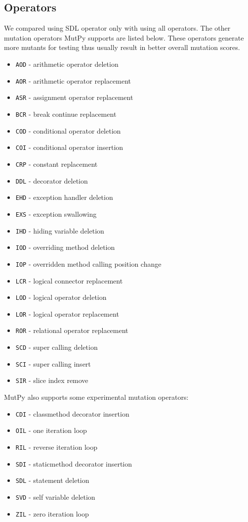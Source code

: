 \documentclass[12pt]{article}
\begin{document}
\subsection{Operators}
We compared using SDL operator only with using all operators. The other mutation operators MutPy supports are listed below. These operators generate more mutants for testing thus usually result in better overall mutation scores.

\begin{itemize}
  \itemsep0em 
  \item \texttt{AOD} - arithmetic operator deletion
  \item \texttt{AOR} - arithmetic operator replacement
  \item \texttt{ASR} - assignment operator replacement
  \item \texttt{BCR} - break continue replacement
  \item \texttt{COD} - conditional operator deletion
  \item \texttt{COI} - conditional operator insertion
  \item \texttt{CRP} - constant replacement
  \item \texttt{DDL} - decorator deletion
  \item \texttt{EHD} - exception handler deletion
  \item \texttt{EXS} - exception swallowing
  \item \texttt{IHD} - hiding variable deletion
  \item \texttt{IOD} - overriding method deletion
  \item \texttt{IOP} - overridden method calling position change
  \item \texttt{LCR} - logical connector replacement
  \item \texttt{LOD} - logical operator deletion
  \item \texttt{LOR} - logical operator replacement
  \item \texttt{ROR} - relational operator replacement
  \item \texttt{SCD} - super calling deletion
  \item \texttt{SCI} - super calling insert
  \item \texttt{SIR} - slice index remove
\end{itemize}

MutPy also supports some experimental mutation operators:

\begin{itemize}
  \itemsep0em 
  \item \texttt{CDI} - classmethod decorator insertion
  \item \texttt{OIL} - one iteration loop
  \item \texttt{RIL} - reverse iteration loop
  \item \texttt{SDI} - staticmethod decorator insertion
  \item \texttt{SDL} - statement deletion
  \item \texttt{SVD} - self variable deletion
  \item \texttt{ZIL} - zero iteration loop
\end{itemize}
\end{document}
